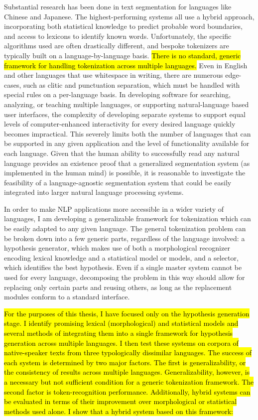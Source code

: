 Substantial research has been done in text segmentation for languages like Chinese and Japanese. The highest-performing systems all use a hybrid approach, incorporating both statistical knowledge to predict probable word boundaries, and access to lexicons to identify known words. Unfortunately, the specific algorithms used are often drastically different, and bespoke tokenizers are typically built on a language-by-language basis. \hl{There is no standard, generic framework for handling tokenization across multiple languages.} Even in English and other languages that use whitespace in writing, there are numerous edge-cases, such as clitic and punctuation separation, which must be handled with special rules on a per-language basis. In developing software for searching, analyzing, or teaching multiple languages, or supporting natural-language based user interfaces, the complexity of developing separate systems to support equal levels of computer-enhanced interactivity for every desired language quickly becomes impractical. This severely limits both the number of languages that can be supported in any given application and the level of functionality available for each language. Given that the human ability to successfully read any natural language provides an existence proof that a generalized segmentation system (as implemented in the human mind) is possible, it is reasonable to investigate the feasibility of a language-agnostic segmentation system that could be easily integrated into larger natural language processing systems.

In order to make NLP applications more accessible in a wider variety of languages, I am developing a generalizable framework for tokenization which can be easily adapted to any given language. The general tokenization problem can be broken down into a few generic parts, regardless of the language involved: a hypothesis generator, which makes use of both a morphological recognizer encoding lexical knowledge and a statistical model or models, and a selector, which identifies the best hypothesis. Even if a single master system cannot be used for every language, decomposing the problem in this way should allow for replacing only certain parts and reusing others, as long as the replacement modules conform to a standard interface.

\hl{For the purposes of this thesis, I have focused only on the hypothesis generation stage. I identify promising lexical (morphological) and statistical models and several methods of integrating them into a single framework for hypothesis generation across multiple languages. I then test these systems on corpora of native-speaker texts from three typologically dissimilar languages. The success of each system is determined by two major factors. The first is generalizability, or the consistency of results across multiple languages. Generalizability, however, is a necessary but not sufficient condition for a generic tokenization framework. The second factor is token-recognition performance. Additionally, hybrid systems can be evaluated in terms of their improvement over morphological or statistical methods used alone. I show that a hybrid system based on this framework:}

